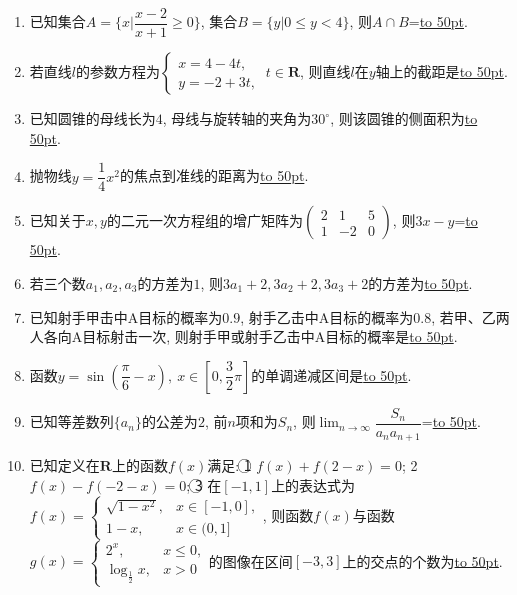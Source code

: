 \documentclass[10pt,a4paper]{article}
\newcommand{\blank}[1]{\underline{\hbox to #1pt{}}}
\begin{document}
\begin{enumerate}[1.]
\item 已知集合$A=\{x|\dfrac{x-2}{x+1}\ge 0\}$, 集合$B=\{y|0 \le y<4\}$, 则$A\cap B$=\blank{50}.
\item 若直线$l$的参数方程为$\begin{cases} x=4-4t,  \\ y=-2+3t,\end{cases} \  t\in \mathbf{R}$, 则直线$l$在$y$轴上的截距是\blank{50}.
\item 已知圆锥的母线长为$4$, 母线与旋转轴的夹角为$30^\circ$, 则该圆锥的侧面积为\blank{50}.
\item 抛物线$y=\dfrac14{x^2}$的焦点到准线的距离为\blank{50}.
\item 已知关于$x,y$的二元一次方程组的增广矩阵为$\begin{pmatrix} 2 & 1 & 5  \\ 1 & -2 & 0 \end{pmatrix}$, 则$3x-y$=\blank{50}.
\item 若三个数$a_1,a_2,a_3$的方差为$1$, 则$3a_1+2,3a_2+2,3a_3+2$的方差为\blank{50}.
\item 已知射手甲击中A目标的概率为$0.9$, 射手乙击中A目标的概率为$0.8$, 若甲、乙两人各向A目标射击一次, 则射手甲或射手乙击中A目标的概率是\blank{50}.
\item 函数$y=\sin (\dfrac{\pi}6-x), \ x\in [0,\dfrac32\pi]$的单调递减区间是\blank{50}.
\item 已知等差数列$\{a_n\}$的公差为$2$, 前$n$项和为$S_n$, 则$\displaystyle\lim_{n\to\infty}\dfrac{S_n}{{a_n}{a_{n+1}}}$=\blank{50}.
\item 已知定义在$\mathbf{R}$上的函数$f(x)$满足: \textcircled{1} $f(x)+f(2-x)=0$; \textcircled{2} $f(x)-f(-2-x)=0$; \textcircled{3} 在$[-1,1]$上的表达式为$f(x)=\begin{cases} \sqrt{1-x^2}, & x\in [-1,0], \\ 1-x, & x\in (0,1] \end{cases}$, 则函数$f(x)$与函数$g(x)=\begin{cases} 2^x, & x\le 0, \\ \log_{\frac12} x,& x>0 \end{cases}$的图像在区间$[-3,3]$上的交点的个数为\blank{50}.



\end{enumerate}
\end{document}

